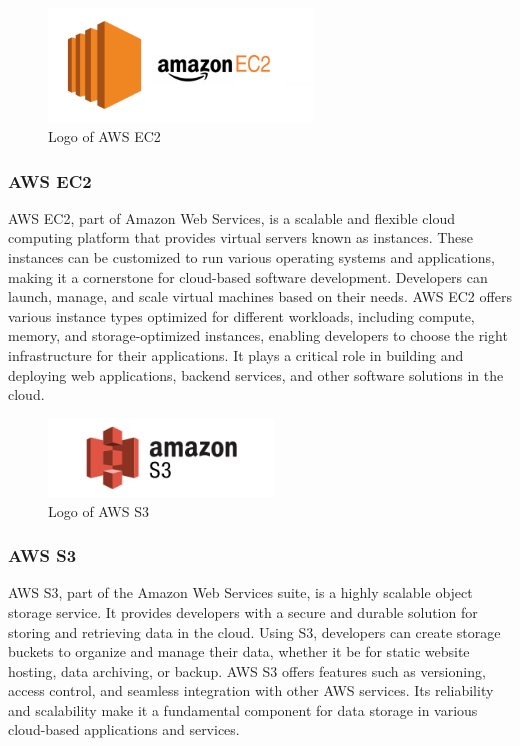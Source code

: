 \documentclass[conference]{IEEEtran}
\begin{document}
        \begin{figure}[htbp]
        \centerline{\includegraphics[width=7cm]{Images/logo/aws.png}}
        \label{fig}
        \caption{Logo of AWS EC2}
        \end{figure}
        \subsubsection{AWS EC2}
        AWS EC2, part of Amazon Web Services, is a scalable and flexible cloud computing platform that provides virtual servers known as instances. These instances can be customized to run various operating systems and applications, making it a cornerstone for cloud-based software development. Developers can launch, manage, and scale virtual machines based on their needs. AWS EC2 offers various instance types optimized for different workloads, including compute, memory, and storage-optimized instances, enabling developers to choose the right infrastructure for their applications. It plays a critical role in building and deploying web applications, backend services, and other software solutions in the cloud.\\
        
        \begin{figure}[htbp]
        \centerline{\includegraphics[width=6cm]{Images/logo/awss3.png}}
        \label{fig}
        \caption{Logo of AWS S3}
        \end{figure}
        \subsubsection{AWS S3}
        AWS S3, part of the Amazon Web Services suite, is a highly scalable object storage service. It provides developers with a secure and durable solution for storing and retrieving data in the cloud. Using S3, developers can create storage buckets to organize and manage their data, whether it be for static website hosting, data archiving, or backup. AWS S3 offers features such as versioning, access control, and seamless integration with other AWS services. Its reliability and scalability make it a fundamental component for data storage in various cloud-based applications and services.\\
\end{document}
